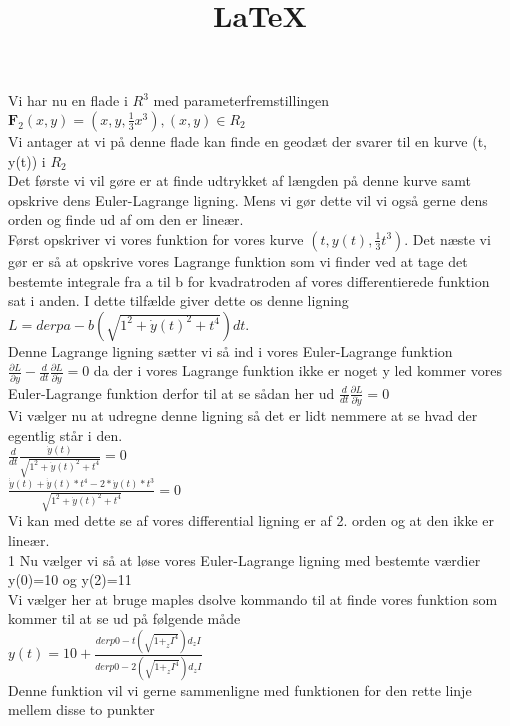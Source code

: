 \documentclass[12pt]{article}
\title{LaTeX}
\date{}
\begin{document}
  \maketitle
Vi har nu en flade i $R^3$ med parameterfremstillingen \\
$\textbf{F}_{2}(x,y)=(x, y, \frac{1}{3}x^3), (x,y) \in R_{2} $\\
Vi antager at vi på denne flade kan finde en geodæt  der svarer til en kurve (t, y(t)) i $R_{2}$ \\
Det første vi vil gøre er at finde udtrykket af længden på denne kurve samt opskrive dens Euler-Lagrange ligning. Mens vi gør dette vil vi også gerne dens orden og finde ud af om den er lineær. \\
Først opskriver vi vores funktion for vores kurve $(t,y(t), \frac{1}{3} t^3)$. Det næste vi gør er så at opskrive vores Lagrange funktion som vi finder ved at tage det bestemte integrale fra a til b for kvadratroden af vores differentierede funktion sat i anden. I dette tilfælde giver dette os denne ligning \\
$L=derp a-b( \sqrt{1^2+ \dot{y}(t)^2+t^4})dt. $\\
Denne Lagrange ligning sætter vi så ind i vores Euler-Lagrange funktion $ \frac{ \partial L}{ \partial y}-  \frac{d}{dt} \frac{ \partial L}{ \partial \dot{y}}=0$ da der i vores Lagrange funktion ikke er noget y led kommer vores Euler-Lagrange funktion derfor til at se sådan her ud $ \frac{d}{dt} \frac{ \partial L}{ \partial \dot{y}}=0 $\\
Vi vælger nu at udregne denne ligning så det er lidt nemmere at se hvad der egentlig står i den. \\
$ \frac{d}{dt} \frac{ \dot{y}(t)}{ \sqrt{1^2+ \dot{y}(t)^2+t^4}}=0  $\\
$ \frac{ \dot{ \dot{y}}(t)+ \dot{ \dot{y}}(t)*t^4-2* \dot{y}(t)*t^3}{\sqrt{1^2+ \dot{y}(t)^2+t^4}}=0 $\\
Vi kan med dette se af vores differential ligning er af 2. orden og at den ikke er lineær. \\1
Nu vælger vi så at løse vores Euler-Lagrange ligning med bestemte værdier y(0)=10 og y(2)=11 \\
Vi vælger her at bruge maples dsolve kommando til at finde vores funktion som kommer til at se ud på følgende måde \\
$y(t)=10+ \frac{derp 0-t(\sqrt{1+_zI^4})d_zI}{derp 0-2(\sqrt{1+_zI^4})d_zI} $ \\
Denne funktion vil vi gerne sammenligne med funktionen for den rette linje mellem disse to punkter \\
\end{document}
